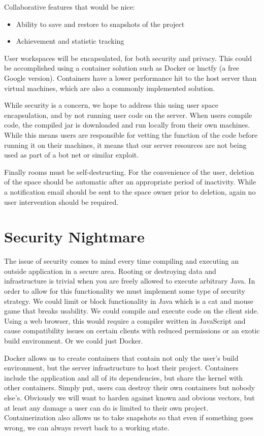 \documentclass[11pt]{report}
\begin{document}
    Collaborative features that would be nice:
    \begin{itemize}
      \item Ability to save and restore to snapshots of the project
      \item Achievement and statistic tracking
    \end{itemize}
    
    User workspaces will be encapsulated, for both security and privacy. This could be accomplished using a container solution such as Docker or lmctfy (a free Google version). Containers have a lower performance hit to the host server than virtual machines, which are also a commonly implemented solution.  
    
    While security is a concern, we hope to address this using user space encapsulation, and by not running user code on the server. When users compile code, the compiled jar is downloaded and run locally from their own machines. While this means users are responsible for vetting the function of the code before running it on their machines, it means that our server resources are not being used as part of a bot net or similar exploit.
    
    Finally rooms must be self-destructing. For the convenience of the user, deletion of the space should be automatic after an appropriate period of inactivity. While a notification email should be sent to the space owner prior to deletion, again no user intervention should be required.

\section{Security Nightmare}
    The issue of security comes to mind every time compiling and executing an outside application in a secure area. Rooting or destroying data and infrastructure is trivial when you are freely allowed to execute arbitrary Java. In order to allow for this functionality we must implement some type of security strategy. We could limit or block functionality in Java which is a cat and mouse game that breaks usability. We could compile and execute code on the client side. Using a web browser, this would require a compiler written in JavaScript and cause compatibility issues on certain clients with reduced permissions or an exotic build environment. Or we could just Docker.


    Docker allows us to create containers that contain not only the user's build environment, but the server infrastructure to host their project. Containers include the application and all of its dependencies, but share the kernel with other containers. Simply put, users can destroy their own containers but nobody else’s. Obviously we will want to harden against known and obvious vectors, but at least any damage a user can do is limited to their own project. Containerization also allows us to take snapshots so that even if something goes wrong, we can always revert back to a working state.
\end{document}
